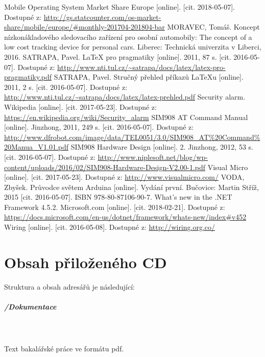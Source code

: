 \documentclass[FM,DP]{tulthesis}  %
\begin{document}
\begin{thebibliography}{10}
Mobile Operating System Market Share Europe [online]. [cit. 2018-05-07]. Dostupné z: \url{http://gs.statcounter.com/os-market-share/mobile/europe/#monthly-201704-201804-bar}
MORAVEC, Tomáš. Koncept nízkonákladového sledovacího zařízení pro osobní automobily: The concept of a low cost tracking device for personal cars. Liberec: Technická univerzita v Liberci, 2016.
SATRAPA, Pavel. LaTeX pro pragmatiky [online]. 2011, 87 s. [cit. 2016-05-07]. Dostupné z: \url{http://www.nti.tul.cz/~satrapa/docs/latex/latex-pro-pragmatiky.pdf}
SATRAPA, Pavel. Stručný přehled příkazů LaTeXu [online]. 2011, 2 s. [cit. 2016-05-07]. Dostupné z: \url{http://www.nti.tul.cz/~satrapa/docs/latex/latex-prehled.pdf}
Security alarm. Wikipedia [online]. [cit. 2017-05-23]. Dostupné z: \url{https://en.wikipedia.org/wiki/Security_alarm}
SIM908 AT Command Manual [online]. Jinzhong, 2011, 249 s. [cit. 2016-05-07]. Dostupné z: \url{http://www.dfrobot.com/image/data/TEL0051/3.0/SIM908\_AT\%20Command\%20Manua\_V1.01.pdf}
SIM908 Hardware Design [online]. 2. Jinzhong, 2012, 53 s. [cit. 2016-05-07]. Dostupné z: \url{http://www.niplesoft.net/blog/wp-content/uploads/2016/02/SIM908-Hardware-Design-V2.00-1.pdf}
Visual Micro [online]. [cit. 2017-05-23]. Dostupné z: \url{http://www.visualmicro.com/}
VODA, Zbyšek. Průvodce světem Arduina [online]. Vydání první. Bučovice: Martin Stříž, 2015 [cit. 2016-05-07]. ISBN 978-80-87106-90-7.
What's new in the .NET Framework 4.5.2. Microsoft.com [online]. [cit. 2018-02-21]. Dostupné z: \url{https://docs.microsoft.com/en-us/dotnet/framework/whats-new/index#v452}
Wiring [online]. [cit. 2016-05-08]. Dostupné z: \url{http://wiring.org.co/}
\end{thebibliography}


\appendix

\chapter{Obsah přiloženého CD}
Struktura a obsah adresářů je následující:

\paragraph{/Dokumentace}\mbox{}\\\mbox{}\\
Text bakalářské práce ve formátu pdf.
\end{document}
